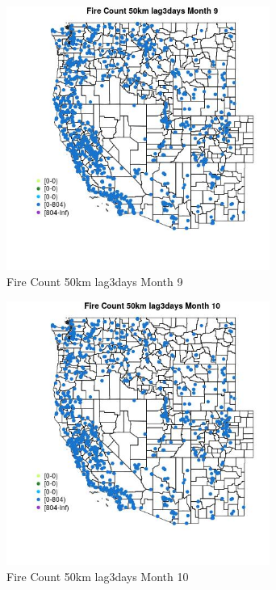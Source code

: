 \begin{figure} 
\centering  
\includegraphics[width=0.77\textwidth]{Code_Outputs/Report_ML_input_PM25_Step4_part_f_de_duplicated_aves_prioritize_24hr_obswNAs_MapObsMo9Fire_Count_50km_lag3days.jpg} 
\caption{\label{fig:Report_ML_input_PM25_Step4_part_f_de_duplicated_aves_prioritize_24hr_obswNAsMapObsMo9Fire_Count_50km_lag3days}Fire Count 50km lag3days Month 9} 
\end{figure} 
 

\begin{figure} 
\centering  
\includegraphics[width=0.77\textwidth]{Code_Outputs/Report_ML_input_PM25_Step4_part_f_de_duplicated_aves_prioritize_24hr_obswNAs_MapObsMo10Fire_Count_50km_lag3days.jpg} 
\caption{\label{fig:Report_ML_input_PM25_Step4_part_f_de_duplicated_aves_prioritize_24hr_obswNAsMapObsMo10Fire_Count_50km_lag3days}Fire Count 50km lag3days Month 10} 
\end{figure} 
 

